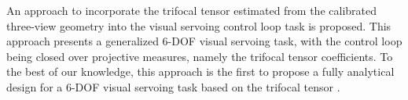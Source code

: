 An approach to incorporate the trifocal tensor estimated from the calibrated three-view geometry into the visual servoing control loop task is proposed. This approach presents a generalized 6-DOF visual servoing task, with the control loop being closed over projective measures, namely the trifocal tensor coefficients. To the best of our knowledge, this approach is the first to propose a fully analytical design for a 6-DOF visual servoing task based on the trifocal tensor \cite{lopez2010visual}\cite{shademan2010three}.

